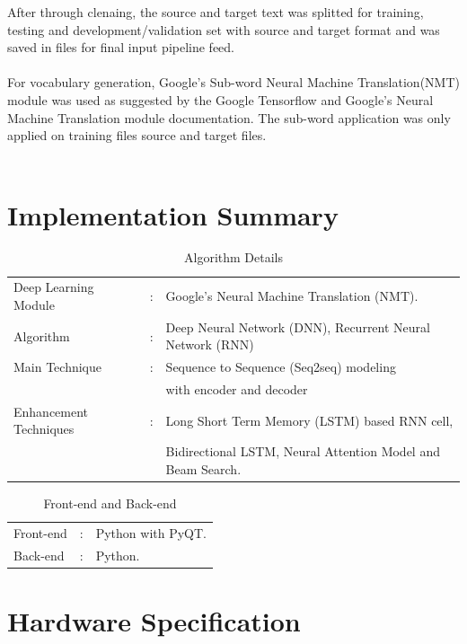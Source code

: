 \documentclass[a4paper,12pt]{report}
\begin{document}
After through clenaing, the source and target text was splitted for training, testing and development/validation set with source and target format and was saved in files for final input pipeline feed.\\\\
For vocabulary generation, Google's Sub-word Neural Machine Translation(NMT) module was used as suggested by the Google Tensorflow and Google's Neural Machine Translation module documentation. The sub-word application was only applied on training files source and target files.\\\\

{\let\clearpage\relax \chapter {Implementation Summary}}
\begin{center}
\begin{table}[H]
\caption{Algorithm Details}
\bigskip
\begin{tabular}{|lll|}
\hline
Deep Learning Module & : & Google's Neural Machine Translation (NMT).\\ 
Algorithm &:& Deep Neural Network (DNN), Recurrent Neural Network (RNN)\\
Main Technique&:&Sequence to Sequence (Seq2seq) modeling \\
&&with encoder and decoder\\
Enhancement Techniques &:& Long Short Term Memory (LSTM) based RNN cell,\\
&&Bidirectional LSTM, Neural Attention Model and Beam Search.\\
\hline
\end{tabular}
\end{table}
\end{center}
\vspace{-3em}
\begin{table}[H]
\caption{Front-end and Back-end}
\bigskip
\begin{center}
\begin{tabular}{|lll|}
\hline
Front-end &:& Python with PyQT.\\
Back-end &:& Python.\\
\hline
\end{tabular}
\end{center}
\end{table}
\newpage
{\let\clearpage\relax \chapter {Hardware Specification}}
\end{document}
